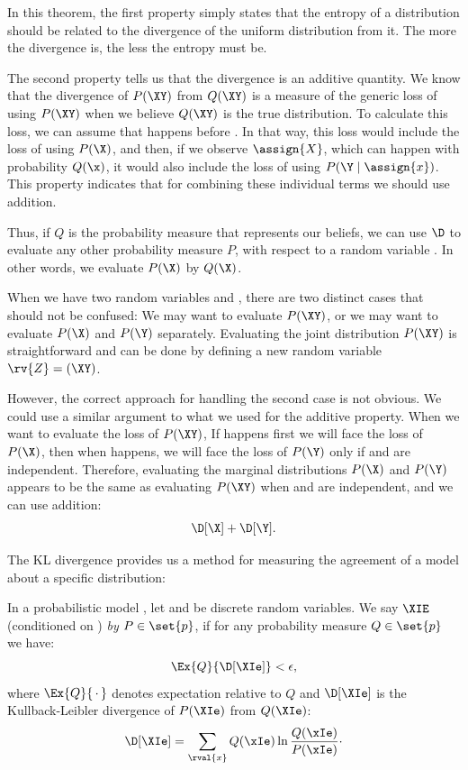 In this theorem, the first property simply states that the entropy of a distribution should be related to the
divergence of the uniform distribution from it.
The more the divergence is, the less the entropy must be.

The second property tells us that the divergence is an additive quantity.
We know that the divergence of $P(\XY)$ from $Q(\XY)$ is a measure of the generic loss of using $P(\XY)$
when we believe $Q(\XY)$ is the true distribution.
To calculate this loss, we can assume that \X happens before \Y.
In that way, this loss would include the loss of using $P(\X)$, and then, if we observe
$\assign{X}$, which can happen with probability $Q(\x)$, it would also include the loss of
using $P(\Y \mid \assign{x})$.
This property indicates that for combining these individual terms we should use addition.

Thus, if $Q$ is the probability measure that represents our beliefs, we can use $\D$ to evaluate any other
probability measure $P$, with respect to a random variable \X.
In other words, we evaluate $P(\X)$ by $Q(\X)$.

When we have two random variables \X and \Y, there are two distinct cases that should not be
confused:
We may want to evaluate $P(\XY)$, or we may want to evaluate $P(\X)$ and $P(\Y)$ separately.
Evaluating the joint distribution $P(\XY)$ is straightforward and can be done by defining a new random variable
$\rv{Z} = (\XY)$.

However, the correct approach for handling the second case is not obvious.
We could use a similar argument to what we used for the additive property.
When we want to evaluate the loss of $P(\XY)$, If \X happens first we will face the loss of $P(\X)$,
then when \Y happens, we will face the loss of $P(\Y)$ only if \X and \Y are independent.
Therefore, evaluating the marginal distributions $P(\X)$ and $P(\Y)$ appears to be the same as evaluating $P(\XY)$
when \X and \Y are independent, and we can use addition:
\[
    \D[\X] + \D[\Y].
\]

The KL divergence provides us a method for measuring the agreement of a model about a specific distribution:

\begin{definition}
    \label{def:e-convergence}
    In a probabilistic model \model, let \X and \E be discrete random variables.
    We say $\XIE$ (\X conditioned on \E) \emph{\econverges by $P \in \set{p}$},
    if for any probability measure $Q \in \set{p}$ we have:
    \begin{equation*}
        \Ex{Q}{\D[\XIe]} < \epsilon,
    \end{equation*}
    where $\Ex{Q}{\,\cdot\,}$ denotes expectation relative to $Q$ and $\D[\XIe]$ is the Kullback-Leibler divergence
    of $P(\XIe)$ from $Q(\XIe)$:
    \[
        \D[\XIe] = \sum_{\rval{x}} Q(\xIe) \ln \frac{Q(\xIe)}{P(\xIe)}\cdot
    \]
\end{definition}

